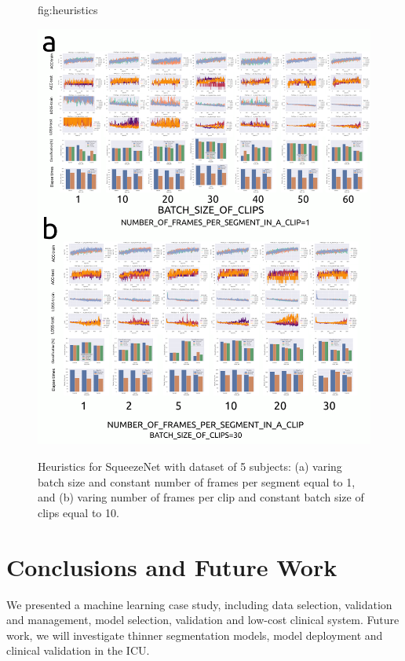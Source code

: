 \documentclass[mlabstract,twocolumn]{jmlr}
\begin{document}
\begin{figure}[htbp]
\floatconts
  {fig:heuristics}
  {
      \caption{
          Heuristics for SqueezeNet \citep{iandola2017squeezenet} with dataset of 5 subjects:
          (a) varing batch size and constant number of frames per segment equal to 1, and
          (b) varing number of frames per clip and constant batch size of clips equal to 10.
      }
  }
  {\includegraphics[width=\columnwidth]{../figures/heuristics_results/versions/drawing-v00}}%
\end{figure}

\section{Conclusions and Future Work}
We presented a machine learning case study, including data selection, validation and management, model selection, validation and low-cost clinical system.
Future work, we will investigate thinner segmentation models, model deployment and clinical validation in the ICU.
\end{document}
